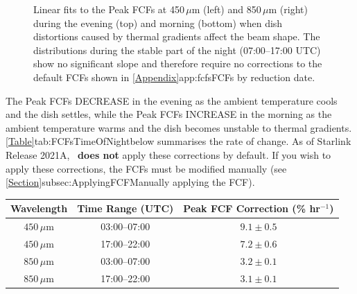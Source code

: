 \begin{figure}
\begin{center}
\caption[FCFs Time of Night Fits]{Linear fits to the Peak FCFs at 450\,$\mu$m (left) and 850\,$\mu$m (right)
 during the evening (top) and morning (bottom) when dish distortions caused by thermal gradients affect the
 beam shape. The distributions during the stable part of the night (07:00--17:00 UTC) show no significant
 slope and therefore require no corrections to the default FCFs shown in
 \cref{Appendix}{app:fcfs}{FCFs by reduction date}. \label{fig:FCFsTimeOfNightFits}}
\end{center}
\end{figure}


The Peak FCFs DECREASE in the evening as the ambient temperature cools and the dish settles, while
the Peak FCFs INCREASE in the morning as the ambient temperature warms and the dish becomes
unstable to thermal gradients. \cref{Table}{tab:FCFsTimeOfNight}{below} summarises the rate of change.
As of Starlink Release 2021A, \oracdr\ \textbf{does not} apply these corrections by default. If
you wish to apply these corrections, the FCFs must be modified manually (see
\cref{Section}{subsec:ApplyingFCF}{Manually applying the FCF}).


\begin{table}[h!]
\begin{center}
\begin{tabular}{|c|c|c|}
 \hline
 \multicolumn{1}{|c|}{Wavelength} &
 \multicolumn{1}{c|}{Time Range (UTC)} &
 \multicolumn{1}{c|}{Peak FCF Correction (\% hr$^{-1}$)}
 \\ \hline
$450\,\mu$m & 03:00--07:00 & $9.1\pm0.5$ \\
$450\,\mu$m & 17:00--22:00 & $7.2\pm0.6$ \\
\hline
$850\,\mu$m & 03:00--07:00 & $3.2\pm0.1$ \\
$850\,\mu$m & 17:00--22:00 & $3.1\pm0.1$ \\ \hline
\end{tabular}
\end{center}
\label{tab:FCFsTimeOfNight}
\end{table}


